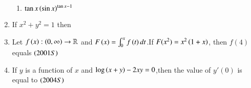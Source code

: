 \documentclass[journal,12pt,twocolumn]{IEEEtran}
\theoremstyle{remark}
\begin{document}
\begin{enumerate}
\begin{enumerate}[label=(\alph*)]
    \item $\tan{x}\left(\sin{x}\right)^{\tan{x}-1}$
\end{enumerate}
\item If $x^2+y^2=1$ then \hfill{}
\begin{enumerate}[label=(\alph*)]
\end{enumerate}
\item Let $f\left(x\right):\left(0,\infty\right)\rightarrow \mathbb{R}$ and $F\left(x\right)=\int_{0}^x f\left(t\right)dt$.If $F(x^2)=x^2\left(1+x\right)$, then $f(4)$ equals $\hfill\brak{2001S}$
\begin{enumerate}[label=(\alph*)]
\end{enumerate}
\item If $y$ is a function of $x$ and $\log{\ensuremath{\left(x+y\right)}}-2xy=0$,then the value of $y'(0)$ is equal to $\hfill\brak{2004S}$
\begin{enumerate}[label=(\alph*)]

\end{enumerate}
\end{enumerate}
\end{document}
